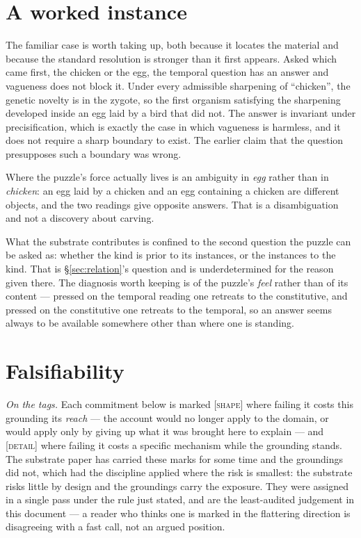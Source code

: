 \documentclass[11pt,a4paper]{article}
\theoremstyle{remark}\newtheorem{remark}[definition]{Remark}
\begin{document}
\section{A worked instance}\label{sec:chicken}

The familiar case is worth taking up, both because it locates the material and because the standard resolution is stronger than it first appears. Asked which came first, the chicken or the egg, the temporal question has an answer and vagueness
does not block it. Under every admissible sharpening of ``chicken'', the genetic novelty is in the
zygote, so the first organism satisfying the sharpening developed inside an egg laid by a bird that
did not. The answer is invariant under precisification, which is exactly the case in which vagueness
is harmless, and it does not require a sharp boundary to exist. The earlier claim that the question
presupposes such a boundary was wrong.

Where the puzzle's force actually lives is an ambiguity in \emph{egg} rather than in \emph{chicken}:
an egg laid by a chicken and an egg containing a chicken are different objects, and the two readings
give opposite answers. That is a disambiguation and not a discovery about carving.

What the substrate contributes is confined to the second question the puzzle can be asked as: whether
the kind is prior to its instances, or the instances to the kind. That is \S\ref{sec:relation}'s
question and is underdetermined for the reason given there. The diagnosis worth keeping is of the
puzzle's \emph{feel} rather than of its content --- pressed on the temporal reading one retreats to
the constitutive, and pressed on the constitutive one retreats to the temporal, so an answer seems
always to be available somewhere other than where one is standing.

\section{Falsifiability}\label{sec:falsifiability}

\noindent\emph{On the tags.} Each commitment below is marked \textsc{[shape]} where failing it costs
this grounding its \emph{reach} --- the account would no longer apply to the domain, or would apply
only by giving up what it was brought here to explain --- and \textsc{[detail]} where failing it costs
a specific mechanism while the grounding stands. The substrate paper has carried these marks for some
time and the groundings did not, which had the discipline applied where the risk is smallest: the
substrate risks little by design and the groundings carry the exposure. They were assigned in a single
pass under the rule just stated, and are the least-audited judgement in this document --- a reader who
thinks one is marked in the flattering direction is disagreeing with a fast call, not an argued
position.
\end{document}
